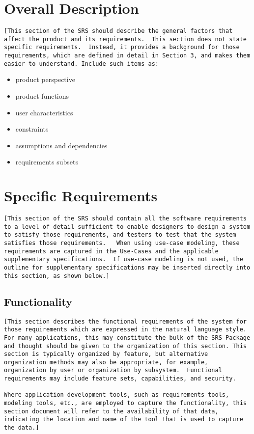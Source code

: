 \documentclass[a4paper,12pt,chapterprefix=false,bibliography=totoc,listof=totoc]{scrreprt}
\begin{document}
\chapter{Overall Description}
\begin{verbatim}
[This section of the SRS should describe the general factors that affect the product and its requirements.  This section does not state specific requirements.  Instead, it provides a background for those requirements, which are defined in detail in Section 3, and makes them easier to understand. Include such items as:
\end{verbatim}
\begin{itemize}
	\item product perspective
	\item product functions
	\item user characteristics
	\item constraints
	\item assumptions and dependencies
	\item requirements subsets
\end{itemize}

\chapter{Specific Requirements}
\begin{verbatim}
[This section of the SRS should contain all the software requirements to a level of detail sufficient to enable designers to design a system to satisfy those requirements, and testers to test that the system satisfies those requirements.   When using use-case modeling, these requirements are captured in the Use-Cases and the applicable supplementary specifications.  If use-case modeling is not used, the outline for supplementary specifications may be inserted directly into this section, as shown below.]
\end{verbatim}

\section{Functionality}
\begin{verbatim}
[This section describes the functional requirements of the system for those requirements which are expressed in the natural language style. For many applications, this may constitute the bulk of the SRS Package and thought should be given to the organization of this section. This section is typically organized by feature, but alternative organization methods may also be appropriate, for example, organization by user or organization by subsystem.  Functional requirements may include feature sets, capabilities, and security.

Where application development tools, such as requirements tools, modeling tools, etc., are employed to capture the functionality, this section document will refer to the availability of that data, indicating the location and name of the tool that is used to capture the data.]
\end{verbatim}
\end{document}
